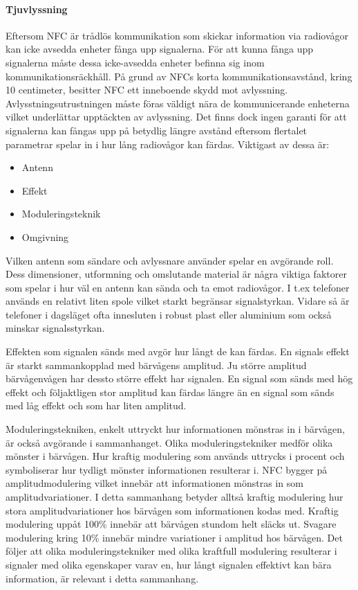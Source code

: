 \documentclass[11pt]{article}
\begin{document}
\paragraph{Tjuvlyssning}
Eftersom NFC är trådlös kommunikation som skickar information via radiovågor kan icke avsedda enheter fånga upp signalerna. För att kunna fånga upp signalerna måste dessa icke-avsedda enheter befinna sig inom kommunikationsräckhåll. På grund av NFCs korta kommunikationsavstånd, kring 10 centimeter, besitter NFC ett inneboende skydd mot avlyssning. Avlysstningsutrustningen måste föras väldigt nära de kommunicerande enheterna vilket underlättar upptäckten av avlyssning. Det finns dock ingen garanti för att signalerna kan fångas upp på betydlig längre avstånd eftersom flertalet parametrar spelar in i hur lång radiovågor kan färdas. Viktigast av dessa är:

\begin{itemize}
\item Antenn
\item Effekt
\item Moduleringsteknik
\item Omgivning
\end{itemize}

Vilken antenn som sändare och avlyssnare använder spelar en avgörande roll. Dess dimensioner, utformning och omslutande material är några viktiga faktorer som spelar i hur väl en antenn kan sända och ta emot radiovågor. I t.ex telefoner används en relativt liten spole vilket starkt begränsar signalstyrkan. Vidare så är telefoner i dagsläget ofta innesluten i robust plast eller aluminium som också minskar signalsstyrkan.

Effekten som signalen sänds med avgör hur långt de kan färdas. En signals effekt är starkt sammankopplad med bärvågens amplitud. Ju större amplitud bärvågenvågen har dessto större effekt har signalen. En signal som sänds med hög effekt och följaktligen stor amplitud kan färdas längre än en signal som sänds med låg effekt och som har liten amplitud. 

Moduleringstekniken, enkelt uttryckt hur informationen mönstras in i bärvågen, är också avgörande i sammanhanget. Olika moduleringstekniker medför olika mönster i bärvågen. Hur kraftig modulering som används uttrycks i procent och symboliserar hur tydligt mönster informationen resulterar i. NFC bygger på amplitudmodulering vilket innebär att informationen mönstras in som amplitudvariationer. I detta sammanhang betyder alltså kraftig modulering hur stora amplitudvariationer hos bärvågen som informationen kodas med. Kraftig modulering uppåt 100\% innebär att bärvågen stundom helt släcks ut. Svagare modulering kring 10\% innebär mindre variationer i amplitud hos bärvågen. Det följer att olika moduleringstekniker med olika kraftfull modulering resulterar i signaler med olika egenskaper varav en, hur långt signalen effektivt kan bära information, är relevant i detta sammanhang.
\end{document}

